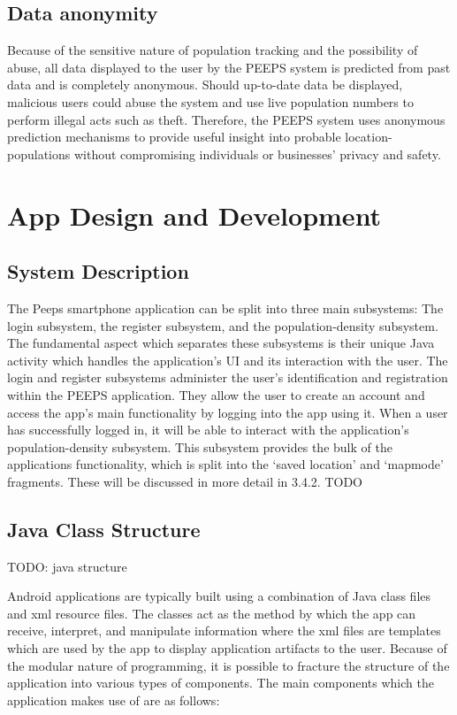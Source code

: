 \subsection{Data anonymity}
Because of the sensitive nature of population tracking and the possibility of abuse, all data displayed to the user by the PEEPS system is predicted from past data and is completely anonymous. Should up-to-date data be displayed, malicious users could abuse the system and use live population numbers to perform illegal acts such as theft. Therefore, the PEEPS system uses anonymous prediction mechanisms to provide useful insight into probable location-populations without compromising individuals or businesses’ privacy and safety. 

\section{App Design and Development}
\subsection{System Description}
The Peeps smartphone application can be split into three main subsystems: The login subsystem, the register subsystem, and the population-density subsystem. The fundamental aspect which separates these subsystems is their unique Java activity which handles the application’s UI and its interaction with the user.  The login and register subsystems administer the user’s identification and registration within the PEEPS application. They allow the user to create an account and access the app’s main functionality by logging into the app using it. When a user has successfully logged in, it will be able to interact with the application’s population-density subsystem. This subsystem provides the bulk of the applications functionality, which is split into the ‘saved location’ and ‘mapmode’ fragments. These will be discussed in more detail in 3.4.2. TODO

\subsection{Java Class Structure}

TODO: java structure

Android applications are typically built using a combination of Java class files and xml resource files. The classes act as the method by which the app can receive, interpret, and manipulate information where the xml files are templates which are used by the app to display application artifacts to the user. Because of the modular nature of programming, it is possible to fracture the structure of the application into various types of components. The main components which the application makes use of are as follows:

